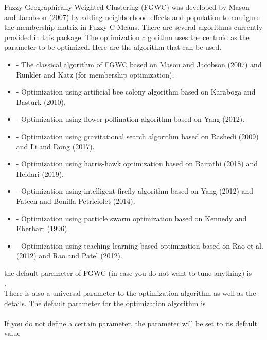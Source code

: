\documentclass[a4paper]{book}
\begin{document}
\begin{Details}\relax
Fuzzy Geographically Weighted Clustering (FGWC) was developed by Mason and Jacobson (2007) by adding 
neighborhood effects and population to configure the membership matrix in Fuzzy C-Means. There are several algorithms currently
provided in this package. The optimization algorithm uses the centroid as the parameter to be optimized. Here are the
algorithm that can be used.
\begin{itemize}

\item{}  - The classical algorithm of FGWC based on Mason and Jacobson (2007) and Runkler and Katz (for membership optimization).
\item{}  - Optimization using artificial bee colony algorithm based on Karaboga and Basturk (2010).
\item{}  - Optimization using flower pollination algorithm based on Yang (2012).
\item{}  - Optimization using gravitational search algorithm based on Rashedi (2009) and Li and Dong (2017).
\item{}  - Optimization using harris-hawk optimization based on Bairathi (2018) and Heidari (2019). 
\item{}  - Optimization using intelligent firefly algorithm based on Yang (2012) and Fateen and Bonilla-Petriciolet (2014).
\item{}  - Optimization using particle swarm optimization based on Kennedy and Eberhart (1996).
\item{}  - Optimization using teaching-learning based optimization based on Rao et al.(2012) and Rao and Patel (2012).

\end{itemize}

the default parameter of FGWC (in case you do not want to tune anything) is \\{} .\\{}
There is also a universal parameter to the optimization algorithm as well as the details. The default parameter
for the optimization algorithm is \\{}
 \\{}
If you do not define a certain parameter, the parameter will be set to its default value
\end{Details}
\end{document}
